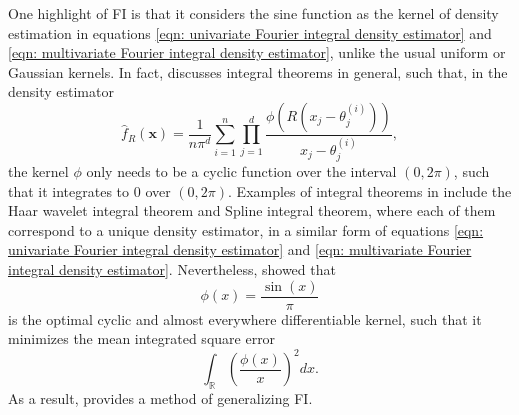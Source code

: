 \documentclass[%
 reprint,
 amsmath,amssymb,
 aps,
]{revtex4-2}
\def\R{\mathbb{R}}
\begin{document}
One highlight of FI is that it considers the sine function as the kernel of density estimation in equations \eqref{eqn: univariate Fourier integral density estimator} and \eqref{eqn: multivariate Fourier integral density estimator}, unlike the usual uniform or Gaussian kernels. In fact, \cite{ho2021integral} discusses integral theorems in general, such that, in the density estimator
\begin{equation} \label{eqn: general integral theorem estimator}
    \hat{f}_R(\mathbf{x}) = \frac{1}{n\pi^d}\sum_{i = 1}^n \prod_{j = 1}^d \frac{\phi(R(x_j - \theta_j^{(i)}))}{x_j - \theta_j^{(i)}},
\end{equation}
the kernel $\phi$ only needs to be a cyclic function over the interval $(0, 2\pi)$, such that it integrates to 0 over $(0, 2\pi)$. Examples of integral theorems in \cite{ho2021integral} include the Haar wavelet integral theorem and Spline integral theorem, where each of them correspond to a unique density estimator, in a similar form of equations \eqref{eqn: univariate Fourier integral density estimator} and \eqref{eqn: multivariate Fourier integral density estimator}. Nevertheless, \cite{ho2021integral} showed that 
\begin{equation} \label{eqn: optimal cyclic kernel (sine)}
    \phi(x) = \frac{\sin(x)}{\pi}
\end{equation}
is the optimal cyclic and almost everywhere differentiable kernel, such that it minimizes the mean integrated square error
\begin{equation} \label{eqn: mean integrated square error}
    \int_\R \left(\frac{\phi(x)}{x} \right)^2dx.
\end{equation}
As a result, \cite{ho2021integral} provides a method of generalizing FI.
\end{document}
